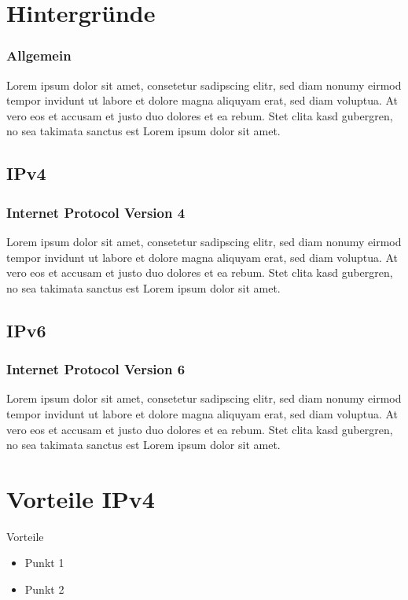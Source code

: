 \documentclass[xcolor=dvipsnames]{beamer}
\subtitle{Modul WIM11} %
\institute{AKAD Pinneberg + Stuttgart} %
\title{\Title}
\author{\Author}
\date{\today}
\begin{document}
\begin{frame}
    \titlepage
\end{frame}


\frame{\tableofcontents} 

 
\section{Hintergründe}
\begin{frame} %
 \frametitle{Allgemein}
  Lorem ipsum dolor sit amet, consetetur sadipscing elitr, sed diam nonumy eirmod tempor invidunt ut labore et dolore magna aliquyam erat, sed diam voluptua. At vero eos et accusam et justo duo dolores et ea rebum. Stet clita kasd gubergren, no sea takimata sanctus est Lorem ipsum dolor sit amet.
\end{frame}


\subsection{IPv4}
\begin{frame}
 \frametitle{Internet Protocol Version 4}
  Lorem ipsum dolor sit amet, consetetur sadipscing elitr, sed diam nonumy eirmod tempor invidunt ut labore et dolore magna aliquyam erat, sed diam voluptua. At vero eos et accusam et justo duo dolores et ea rebum. Stet clita kasd gubergren, no sea takimata sanctus est Lorem ipsum dolor sit amet.
\end{frame}

\subsection{IPv6}
\begin{frame}
  \frametitle{Internet Protocol Version 6}
  Lorem ipsum dolor sit amet, consetetur sadipscing elitr, sed diam nonumy eirmod tempor invidunt ut labore et dolore magna aliquyam erat, sed diam voluptua. At vero eos et accusam et justo duo dolores et ea rebum. Stet clita kasd gubergren, no sea takimata sanctus est Lorem ipsum dolor sit amet.
\end{frame}



\section{Vorteile IPv4}
\begin{frame}
  \begin{block}{Vorteile}
	  \begin{itemize}
  		\item Punkt 1
	  	\item Punkt 2
	  \end{itemize}
  \end{block}
\end{frame}
\end{document}
